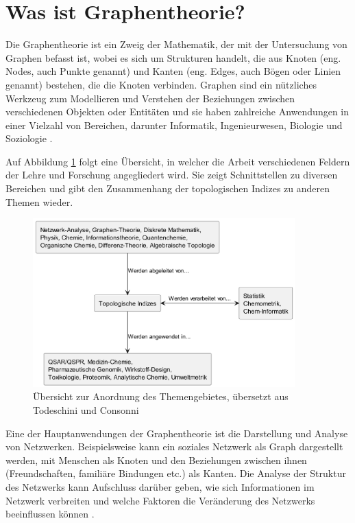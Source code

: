 \section{Was ist Graphentheorie?}

Die Graphentheorie ist ein Zweig der Mathematik, der mit der Untersuchung von Graphen befasst ist, wobei es sich um Strukturen handelt, die aus Knoten (eng. Nodes, auch Punkte genannt) und Kanten (eng. Edges, auch Bögen oder Linien genannt) bestehen, die die Knoten verbinden.
Graphen sind ein nützliches Werkzeug zum Modellieren und Verstehen der Beziehungen zwischen verschiedenen Objekten oder Entitäten und sie haben zahlreiche Anwendungen in einer Vielzahl von Bereichen,
darunter Informatik, Ingenieurwesen, Biologie und Soziologie \cite[p.~1ff.]{bollobas_modern_1998}.

Auf Abbildung \ref{fig:overview_indices} folgt eine Übersicht, in welcher die Arbeit verschiedenen Feldern der Lehre und Forschung angegliedert wird.
Sie zeigt Schnittstellen zu diversen Bereichen und gibt den Zusammenhang der topologischen Indizes zu anderen Themen wieder.

\begin{figure}[H]
    \centering
    \includegraphics[width=0.9\textwidth]{images/10_introduction/overview_molecule_descriptor.png}
    \caption{Übersicht zur Anordnung des Themengebietes, übersetzt aus Todeschini und Consonni \cite{todeschini_handbook_2000}}
    \label{fig:overview_indices}
\end{figure}

Eine der Hauptanwendungen der Graphentheorie ist die Darstellung und Analyse von Netzwerken.
Beispielsweise kann ein soziales Netzwerk als Graph dargestellt werden, mit Menschen als Knoten und den Beziehungen zwischen ihnen (Freundschaften, familiäre Bindungen etc.) als Kanten.
Die Analyse der Struktur des Netzwerks kann Aufschluss darüber geben, wie sich Informationen im Netzwerk verbreiten und welche Faktoren die Veränderung des Netzwerks beeinflussen können \cite[p.~440ff.]{watts_collective_1998}.

